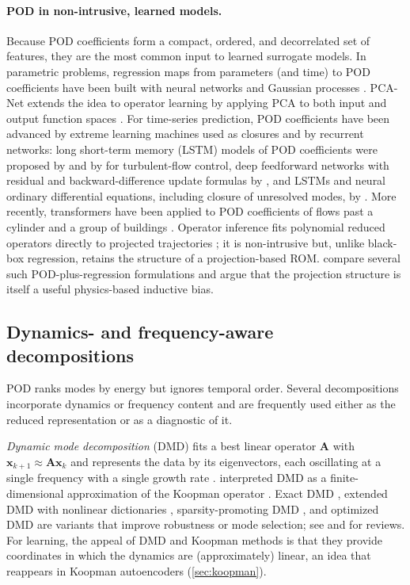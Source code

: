 \paragraph{POD in non-intrusive, learned models.}
Because POD coefficients form a compact, ordered, and decorrelated set of
features, they are the most common input to learned surrogate models. In
parametric problems, regression maps from parameters (and time) to POD
coefficients have been built with neural networks
\parencite{hesthaven2018podnn} and Gaussian processes \parencite{guo2019gpr}.
PCA-Net extends the idea to operator learning by applying PCA to both input and
output function spaces \parencite{bhattacharya2021pcanet}. For time-series
prediction, POD coefficients have been advanced by extreme learning machines
used as closures \parencite{san2018elm} and by recurrent networks:
long short-term memory (LSTM) models of POD coefficients were proposed by
\textcite{wang2018model} and by \textcite{mohan2018lstm} for turbulent-flow
control, deep feedforward networks with residual and backward-difference update
formulas by \textcite{pawar2019deep}, and LSTMs and neural ordinary differential
equations, including closure of unresolved modes, by
\textcite{maulik2020timeseries}. More recently, transformers have been applied
to POD coefficients of flows past a cylinder and a group of buildings
\parencite{wu2022transformer}. Operator inference fits polynomial reduced
operators directly to projected trajectories
\parencite{peherstorfer2016opinf,qian2020liftlearn,kramer2024opinf}; it is
non-intrusive but, unlike black-box regression, retains the structure of a
projection-based ROM. \textcite{swischuk2019projection} compare several such
POD-plus-regression formulations and argue that the projection structure is
itself a useful physics-based inductive bias.

\subsection{Dynamics- and frequency-aware decompositions}
\label{sec:dmd}

POD ranks modes by energy but ignores temporal order. Several decompositions
incorporate dynamics or frequency content and are frequently used either as
the reduced representation or as a diagnostic of it.

\emph{Dynamic mode decomposition} (DMD) fits a best linear operator
$\bm{A}$ with $\bm{x}_{k+1}\approx\bm{A}\bm{x}_k$ and represents the data by
its eigenvectors, each oscillating at a single frequency with a single growth
rate \parencite{schmid2010dmd}. \textcite{rowley2009spectral} interpreted DMD
as a finite-dimensional approximation of the Koopman operator
\parencite{mezic2005,mezic2013}. Exact DMD \parencite{tu2014dmd}, extended DMD
with nonlinear dictionaries \parencite{williams2015edmd}, sparsity-promoting DMD
\parencite{jovanovic2014spdmd}, and optimized DMD \parencite{askham2018optdmd}
are variants that improve robustness or mode selection; see
\textcite{kutz2016dmd} and \textcite{brunton2022koopman} for reviews. For
learning, the appeal of DMD and Koopman methods is that they provide
coordinates in which the dynamics are (approximately) linear, an idea that
reappears in Koopman autoencoders (\cref{sec:koopman}).

